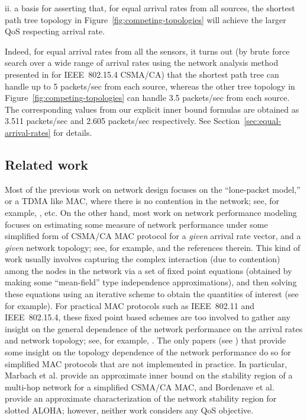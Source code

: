 \documentclass[12pt, draftclsnofoot, onecolumn]{IEEEtran}
\begin{document}
\noindent
ii. a basis for asserting that, for equal arrival rates from all sources, the shortest path tree topology in Figure~\ref{fig:competing-topologies} will achieve the larger QoS respecting arrival rate. 

Indeed, for equal arrival rates from all the sensors, it turns out (by brute force search over a wide range of arrival rates using the network analysis method presented in \cite{srivastava} for IEEE~802.15.4 CSMA/CA) that the shortest path tree can handle up to 5 packets/sec from each source, whereas the other tree topology in Figure~\ref{fig:competing-topologies} can handle 3.5 packets/sec from each source. The corresponding values from our explicit inner bound formulas are obtained as 3.511 packets/sec and 2.605 packets/sec respectively. See Section~\ref{sec:equal-arrival-rates} for details.   

\subsection{Related work} 
\label{subsec:related-work}
Most of the previous work on network design focuses on the ``lone-packet model,'' or a TDMA like MAC, where there is no contention in the network; see, for example, \cite{klein, Lin, ZhangHou, Misra, Costa, fullpaper, smartconnect-paper, multisink}, etc. On the other hand, most work on network performance modeling focuses on estimating some measure of network performance  under some simplified form of CSMA/CA MAC protocol for a \emph{given} arrival rate vector, and a \emph{given} network topology; see, for example, \cite{rachitpaper} and the references therein. This kind of work usually involves capturing the complex interaction (due to contention) among the nodes in the network via a set of fixed point equations (obtained by making some ``mean-field'' type \cite{bordenave} independence approximations), and then solving these equations using an iterative scheme to obtain the quantities of interest (see \cite{bianchi00performance, kumar-etal04new-insights} for example). For practical MAC protocols such as IEEE~802.11 and IEEE~802.15.4, these fixed point based schemes are too involved to gather any insight on the general dependence of the network performance on the arrival rates and network topology; see, for example, \cite{jindal09, park13, rachitpaper}. The only papers (see \cite{marbach11,bordenave}) that provide some insight on the topology dependence of the network performance do so for simplified MAC protocols that are not implemented in practice. In particular, Marbach et al. \cite{marbach11} provide an approximate inner bound on the stability region of a multi-hop network for a simplified CSMA/CA MAC, and Bordenave et al. \cite{bordenave} provide an approximate characterization of the network stability region for slotted ALOHA; however, neither work considers any QoS objective.
\end{document}

